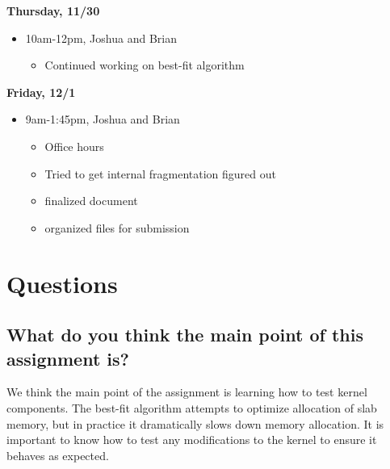 \documentclass[letterpaper, onecolumn, draftclsnofoot, 10pt, compsoc]{IEEEtran}
\begin{document}
\begin{singlespace}
\begin{itemize}
            \end{itemize}
        \textbf{Thursday, 11/30}
            \begin{itemize}
                \item 10am-12pm, Joshua and Brian 
                \begin{itemize}
                    \item Continued working on best-fit algorithm 
                \end{itemize}
            \end{itemize}
        \textbf{Friday, 12/1}
            \begin{itemize}
                \item 9am-1:45pm, Joshua and Brian 
                \begin{itemize}
                    \item Office hours
                    \item Tried to get internal fragmentation figured out
                    \item finalized document
                    \item organized files for submission
                \end{itemize}
            \end{itemize}
    \end{singlespace}
        
\section{Questions}
    
    \subsection{What do you think the main point of this assignment is?}
        \begin{singlespace}
        We think the main point of the assignment is learning how to test kernel components. The best-fit algorithm attempts to optimize allocation of slab memory, but in practice it dramatically slows down memory allocation. It is important to know how to test any modifications to the kernel to ensure it behaves as expected.
         
        \end{singlespace}
    
\end{document}
